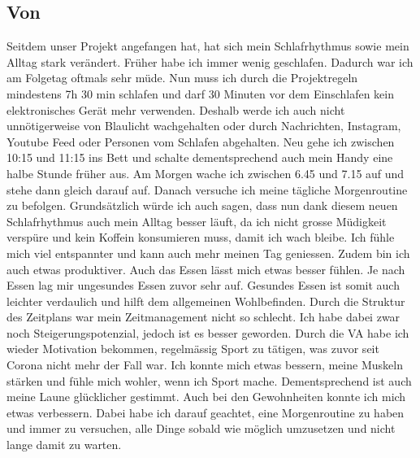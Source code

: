 \subsection{Von \bastian}
\authortoc{\bastian}{\subsectionident}
Seitdem unser Projekt angefangen hat, hat sich mein Schlafrhythmus sowie mein Alltag stark verändert. Früher habe ich immer wenig geschlafen. Dadurch war ich am Folgetag oftmals sehr müde. Nun muss ich durch die Projektregeln mindestens 7h 30 min schlafen und darf 30 Minuten vor dem Einschlafen kein elektronisches Gerät mehr verwenden. Deshalb werde ich auch nicht unnötigerweise von Blaulicht wachgehalten oder durch Nachrichten, Instagram, Youtube Feed oder Personen vom Schlafen abgehalten. Neu gehe ich zwischen 10:15 und 11:15 ins Bett und schalte dementsprechend auch mein Handy eine halbe Stunde früher aus. Am Morgen wache ich zwischen 6.45 und 7.15 auf und stehe dann gleich darauf auf. Danach versuche ich meine tägliche Morgenroutine zu befolgen. Grundsätzlich würde ich auch sagen, dass nun dank diesem neuen Schlafrhythmus auch mein Alltag besser läuft, da ich nicht grosse Müdigkeit verspüre und kein Koffein konsumieren muss, damit ich wach bleibe. Ich fühle mich viel entspannter und kann auch mehr meinen Tag geniessen. Zudem bin ich auch etwas produktiver. Auch das Essen lässt mich etwas besser fühlen. Je nach Essen lag mir ungesundes Essen zuvor sehr auf. Gesundes Essen ist somit auch leichter verdaulich und hilft dem allgemeinen Wohlbefinden. Durch die Struktur des Zeitplans war mein Zeitmanagement nicht so schlecht. Ich habe dabei zwar noch Steigerungspotenzial, jedoch ist es besser geworden. Durch die VA habe ich wieder Motivation bekommen, regelmässig Sport zu tätigen, was zuvor seit Corona nicht mehr der Fall war. Ich konnte mich etwas bessern, meine Muskeln stärken und fühle mich wohler, wenn ich Sport mache. Dementsprechend ist auch meine Laune glücklicher gestimmt. Auch bei den Gewohnheiten konnte ich mich etwas verbessern. Dabei habe ich darauf geachtet, eine Morgenroutine zu haben und immer zu versuchen, alle Dinge sobald wie möglich umzusetzen und nicht lange damit zu warten.
